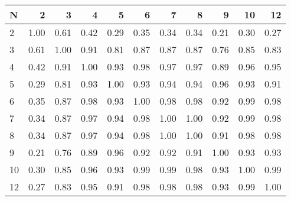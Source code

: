 \begin{tabular}{lrrrrrrrrrr}
\toprule
N &    2  &    3  &    4  &    5  &    6  &    7  &    8  &    9  &    10 &    12 \\
\midrule
2  &  1.00 &  0.61 &  0.42 &  0.29 &  0.35 &  0.34 &  0.34 &  0.21 &  0.30 &  0.27 \\
3  &  0.61 &  1.00 &  0.91 &  0.81 &  0.87 &  0.87 &  0.87 &  0.76 &  0.85 &  0.83 \\
4  &  0.42 &  0.91 &  1.00 &  0.93 &  0.98 &  0.97 &  0.97 &  0.89 &  0.96 &  0.95 \\
5  &  0.29 &  0.81 &  0.93 &  1.00 &  0.93 &  0.94 &  0.94 &  0.96 &  0.93 &  0.91 \\
6  &  0.35 &  0.87 &  0.98 &  0.93 &  1.00 &  0.98 &  0.98 &  0.92 &  0.99 &  0.98 \\
7  &  0.34 &  0.87 &  0.97 &  0.94 &  0.98 &  1.00 &  1.00 &  0.92 &  0.99 &  0.98 \\
8  &  0.34 &  0.87 &  0.97 &  0.94 &  0.98 &  1.00 &  1.00 &  0.91 &  0.98 &  0.98 \\
9  &  0.21 &  0.76 &  0.89 &  0.96 &  0.92 &  0.92 &  0.91 &  1.00 &  0.93 &  0.93 \\
10 &  0.30 &  0.85 &  0.96 &  0.93 &  0.99 &  0.99 &  0.98 &  0.93 &  1.00 &  0.99 \\
12 &  0.27 &  0.83 &  0.95 &  0.91 &  0.98 &  0.98 &  0.98 &  0.93 &  0.99 &  1.00 \\
\bottomrule
\end{tabular}
